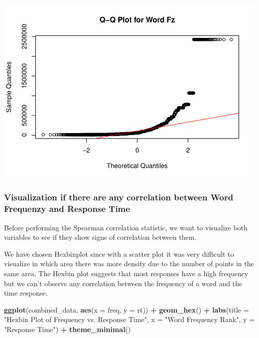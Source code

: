 \documentclass[
]{article}
\newenvironment{Shaded}{\begin{snugshade}}{\end{snugshade}}
\newcommand{\AttributeTok}[1]{\textcolor[rgb]{0.13,0.29,0.53}{#1}}
\newcommand{\FunctionTok}[1]{\textcolor[rgb]{0.13,0.29,0.53}{\textbf{#1}}}
\newcommand{\NormalTok}[1]{#1}
\newcommand{\SpecialCharTok}[1]{\textcolor[rgb]{0.81,0.36,0.00}{\textbf{#1}}}
\newcommand{\StringTok}[1]{\textcolor[rgb]{0.31,0.60,0.02}{#1}}
\begin{document}
\includegraphics{EDA_DavidMC_files/figure-latex/unnamed-chunk-19-1.pdf}

\hypertarget{visualization-if-there-are-any-correlation-between-word-frequenzy-and-response-time}{%
\subsubsection{Visualization if there are any correlation between Word
Frequenzy and Response
Time}\label{visualization-if-there-are-any-correlation-between-word-frequenzy-and-response-time}}

Before performing the Spearman correlation statistic, we want to
visualize both variables to see if they show signs of correlation
between them.

We have chosen Hexbinplot since with a scatter plot it was very
difficult to visualize in which area there was more density due to the
number of points in the same area. The Hexbin plot suggests that most
responses have a high frequency but we can't observe any correlation
between the frequency of a word and the time response.

\begin{Shaded}
\begin{Highlighting}[]
\FunctionTok{ggplot}\NormalTok{(combined\_data, }\FunctionTok{aes}\NormalTok{(}\AttributeTok{x =}\NormalTok{ freq, }\AttributeTok{y =}\NormalTok{ rt)) }\SpecialCharTok{+}
  \FunctionTok{geom\_hex}\NormalTok{() }\SpecialCharTok{+}
  \FunctionTok{labs}\NormalTok{(}\AttributeTok{title =} \StringTok{"Hexbin Plot of Frequency vs. Response Time"}\NormalTok{,}
       \AttributeTok{x =} \StringTok{"Word Frequency Rank"}\NormalTok{, }\AttributeTok{y =} \StringTok{"Response Time"}\NormalTok{) }\SpecialCharTok{+}
  \FunctionTok{theme\_minimal}\NormalTok{()}
\end{Highlighting}
\end{Shaded}
\end{document}
